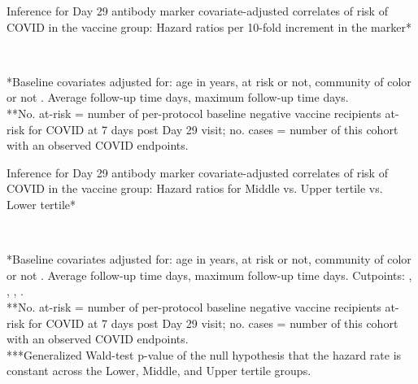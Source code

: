 \documentclass[
]{article}
\begin{document}
\begin{table}[H]
\caption{Inference for Day 29 antibody marker covariate-adjusted correlates of risk of COVID in the vaccine group: Hazard ratios per 10-fold increment in the marker*}
\begin{center}
    \\
\end{center}
*Baseline covariates adjusted for: age in years, at risk or not, community of color or not
. Average follow-up time  days, maximum follow-up time  days.\\
**No. at-risk = number of per-protocol baseline negative vaccine recipients at-risk for COVID at 7 days post Day 29 visit; no. cases = number of this cohort with an observed COVID endpoints.

    \label{tab:CoR_univariable_svycoxph_pretty_mock}
\end{table}

\begin{table}[H]
\caption{Inference for Day 29 antibody marker covariate-adjusted correlates of risk of COVID in the vaccine group: Hazard ratios for Middle vs. Upper tertile vs. Lower tertile*}
\begin{center}
\setlength{\tabcolsep}{.5ex}
\\
\end{center}
*Baseline covariates adjusted for: age in years, at risk or not, community of color or not
. Average follow-up time  days, maximum follow-up time  days. 
Cutpoints: 
,  
,  
,  
.
\\
**No. at-risk = number of per-protocol baseline negative vaccine recipients at-risk for COVID at 7 days post Day 29 visit; no. cases = number of this cohort with an observed COVID endpoints.\\
***Generalized Wald-test p-value of the null hypothesis that the hazard rate is constant across the Lower, Middle, and Upper tertile groups.

    \label{tab:CoR_univariable_svycoxph_cat_pretty_mock}
\end{table}
\end{document}
